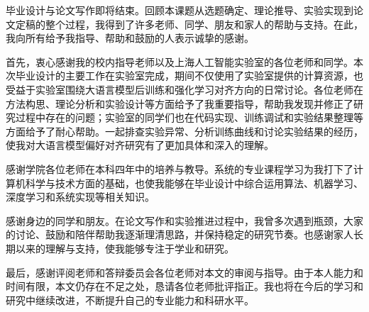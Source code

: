 
\begin{acknowledgements}
毕业设计与论文写作即将结束。回顾本课题从选题确定、理论推导、实验实现到论文定稿的整个过程，我得到了许多老师、同学、朋友和家人的帮助与支持。在此，我向所有给予我指导、帮助和鼓励的人表示诚挚的感谢。

首先，衷心感谢我的校内指导老师以及上海人工智能实验室的各位老师和同学。本次毕业设计的主要工作在实验室完成，期间不仅使用了实验室提供的计算资源，也受益于实验室围绕大语言模型后训练和强化学习对齐方向的日常讨论。各位老师在方法构思、理论分析和实验设计等方面给予了我重要指导，帮助我发现并修正了研究过程中存在的问题；实验室的同学们也在代码实现、训练调试和实验结果整理等方面给予了耐心帮助。一起排查实验异常、分析训练曲线和讨论实验结果的经历，使我对大语言模型偏好对齐研究有了更加具体和深入的理解。

感谢学院各位老师在本科四年中的培养与教导。系统的专业课程学习为我打下了计算机科学与技术方面的基础，也使我能够在毕业设计中综合运用算法、机器学习、深度学习和系统实现等相关知识。

感谢身边的同学和朋友。在论文写作和实验推进过程中，我曾多次遇到瓶颈，大家的讨论、鼓励和陪伴帮助我逐渐理清思路，并保持稳定的研究节奏。也感谢家人长期以来的理解与支持，使我能够专注于学业和研究。

最后，感谢评阅老师和答辩委员会各位老师对本文的审阅与指导。由于本人能力和时间有限，本文仍存在不足之处，恳请各位老师批评指正。我也将在今后的学习和研究中继续改进，不断提升自己的专业能力和科研水平。
\end{acknowledgements}
